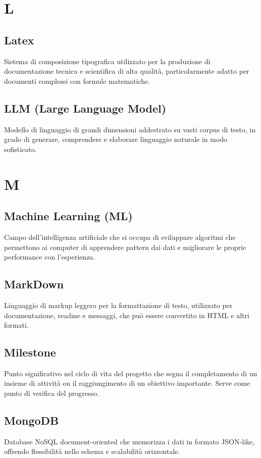\documentclass[a4paper,11pt]{article}
\begin{document}
\newpage
\section{L}

\subsection{Latex}
Sistema di composizione tipografica utilizzato per la produzione di documentazione tecnica e scientifica di alta qualità, particolarmente adatto per documenti complessi con formule matematiche.

\subsection{LLM (Large Language Model)}
Modello di linguaggio di grandi dimensioni addestrato su vasti corpus di testo, in grado di generare, comprendere e elaborare linguaggio naturale in modo sofisticato.

\newpage
\section{M}

\subsection{Machine Learning (ML)}
Campo dell'intelligenza artificiale che si occupa di sviluppare algoritmi che permettono ai computer di apprendere pattern dai dati e migliorare le proprie performance con l'esperienza.

\subsection{MarkDown}
Linguaggio di markup leggero per la formattazione di testo, utilizzato per documentazione, readme e messaggi, che può essere convertito in HTML e altri formati.

\subsection{Milestone}
Punto significativo nel ciclo di vita del progetto che segna il completamento di un insieme di attività ou il raggiungimento di un obiettivo importante. Serve come punto di verifica del progresso.

\subsection{MongoDB}
Database NoSQL document-oriented che memorizza i dati in formato JSON-like, offrendo flessibilità nello schema e scalabilità orizzontale.
\end{document}
